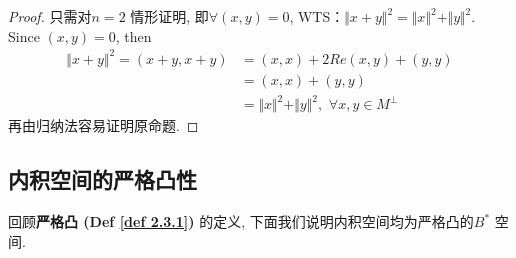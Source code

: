 \begin{defn}
\begin{rmk}
\begin{itemize}
				\begin{proof}
					只需对$n = 2$ 情形证明, 即$\forall (x , y) = 0 $, WTS：$\Vert x + y \Vert^2 = \Vert x \Vert^2 + \Vert y \Vert^2$. \\
					Since $(x , y) = 0$, then
					\begin{align}
						\Vert x + y \Vert^2 
						= (x + y , x + y) 
						&= (x , x) + 2Re(x , y) + (y , y) \\
						&= (x , x) + (y , y) \\
						&= \Vert x \Vert^2 + \Vert y \Vert^2 , \,\, \forall x , y \in M^{\perp}
					\end{align}
					再由归纳法容易证明原命题. 
				\end{proof}
			\end{itemize}
		\end{rmk}
	\end{defn}

\newpage

\subsection{内积空间的严格凸性}
	回顾\textbf{严格凸 (Def \ref{def 2.3.1})} 的定义, 下面我们说明内积空间均为严格凸的$B^*$ 空间. 
	
	\vspace{1em}
	
